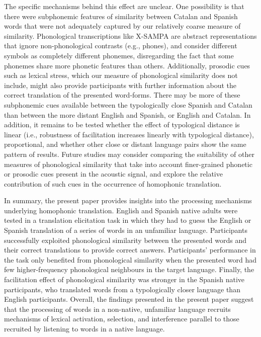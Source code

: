 \documentclass[
]{article}
\begin{document}
The specific mechanisms behind this effect are unclear. One possibility
is that there were subphonemic features of similarity between Catalan
and Spanish words that were not adequately captured by our relatively
coarse measure of similarity. Phonological transcriptions like X-SAMPA
are abstract representations that ignore non-phonological contrasts
(e.g., phones), and consider different symbols as completely different
phonemes, disregarding the fact that some phonemes share more phonetic
features than others. Additionally, prosodic cues such as lexical
stress, which our measure of phonological similarity does not include,
might also provide participants with further information about the
correct translation of the presented word-forms. There may be more of
these subphonemic cues available between the typologically close Spanish
and Catalan than between the more distant English and Spanish, or
English and Catalan. In addition, it remains to be tested whether the
effect of typological distance is linear (i.e., robustness of
facilitation increases linearly with typological distance),
proportional, and whether other close or distant language pairs show the
same pattern of results. Future studies may consider comparing the
suitability of other measures of phonological similarity that take into
account finer-grained phonetic or prosodic cues present in the acoustic
signal, and explore the relative contribution of such cues in the
occurrence of homophonic translation.

In summary, the present paper provides insights into the processing
mechanisms underlying homophonic translation. English and Spanish native
adults were tested in a translation elicitation task in which they had
to guess the English or Spanish translation of a series of words in an
unfamiliar language. Participants successfully exploited phonological
similarity between the presented words and their correct translations to
provide correct answers. Participants' performance in the task only
benefited from phonological similarity when the presented word had few
higher-frequency phonological neighbours in the target language.
Finally, the facilitation effect of phonological similarity was stronger
in the Spanish native participants, who translated words from a
typologically closer language than English participants. Overall, the
findings presented in the present paper suggest that the processing of
words in a non-native, unfamiliar language recruits mechanisms of
lexical activation, selection, and interference parallel to those
recruited by listening to words in a native language.
\end{document}
